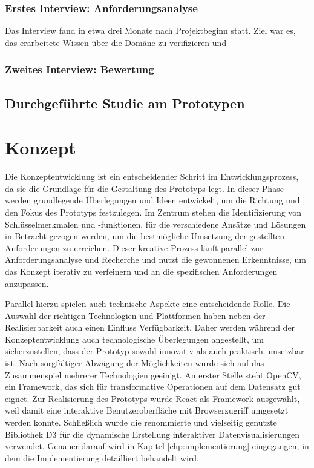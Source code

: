 \documentclass[
  ngerman,
  a4paper,  %
  twoside,  %
  bibliography=totoc,
  headsepline,
  cleardoublepage=empty,
  parskip=half,
  draft=false
]{scrbook}
\begin{document}
\subsection{Erstes Interview: Anforderungsanalyse}
Das Interview fand in etwa drei Monate nach Projektbeginn statt. Ziel war es, das erarbeitete Wissen über die Domäne zu verifizieren und
\subsection{Zweites Interview: Bewertung}
\section{Durchgeführte Studie am Prototypen}

\chapter{Konzept \label{chp:konzept}}
Die Konzeptentwicklung ist ein entscheidender Schritt im Entwicklungsprozess, da sie die Grundlage für die Gestaltung des Prototyps legt. In dieser Phase werden grundlegende Überlegungen und Ideen entwickelt, um die Richtung und den Fokus des Prototyps festzulegen. Im Zentrum stehen die Identifizierung von Schlüsselmerkmalen und -funktionen, für die verschiedene Ansätze und Lösungen in Betracht gezogen werden, um die bestmögliche Umsetzung der gestellten Anforderungen zu erreichen. Dieser kreative Prozess läuft parallel zur Anforderungsanalyse und Recherche und nutzt die gewonnenen Erkenntnisse, um das Konzept iterativ zu verfeinern und an die spezifischen Anforderungen anzupassen.

Parallel hierzu spielen auch technische Aspekte eine entscheidende Rolle. Die Auswahl der richtigen Technologien und Plattformen haben neben der Realisierbarkeit auch einen Einfluss Verfügbarkeit. Daher werden während der Konzeptentwicklung auch technologische Überlegungen angestellt, um sicherzustellen, dass der Prototyp sowohl innovativ als auch praktisch umsetzbar ist. Nach sorgfältiger Abwägung der Möglichkeiten wurde sich auf das Zusammenspiel mehrerer Technologien geeinigt. An erster Stelle steht OpenCV, ein Framework, das sich für transformative Operationen auf dem Datensatz gut eignet. Zur Realisierung des Prototyps wurde React als Framework ausgewählt, weil damit eine interaktive Benutzeroberfläche mit Browserzugriff umgesetzt werden konnte. Schließlich wurde die renommierte und vielseitig genutzte Bibliothek D3 für die dynamische Erstellung interaktiver Datenvisualisierungen verwendet. Genauer darauf wird in Kapitel \ref{chp:implementierung} eingegangen, in dem die Implementierung detailliert behandelt wird.
\end{document}

